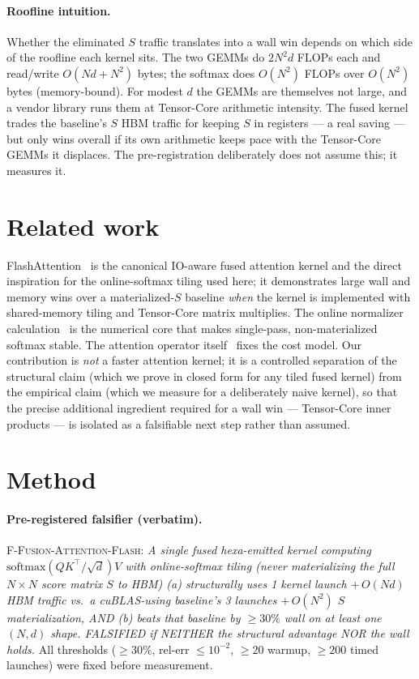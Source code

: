 \documentclass[11pt,a4paper]{article}
\newcommand{\falsifier}{\textsc{F-Fusion-Attention-Flash}}
\begin{document}
\paragraph{Roofline intuition.}
Whether the eliminated $S$ traffic translates into a wall win depends on which
side of the roofline each kernel sits. The two GEMMs do $2N^2 d$ FLOPs each and
read/write $O(Nd + N^2)$ bytes; the softmax does $O(N^2)$ FLOPs over $O(N^2)$
bytes (memory-bound). For modest $d$ the GEMMs are themselves not large, and a
vendor library runs them at Tensor-Core arithmetic intensity. The fused kernel
trades the baseline's $S$ HBM traffic for keeping $S$ in registers --- a real
saving --- but only wins overall if its own arithmetic keeps pace with the
Tensor-Core GEMMs it displaces. The pre-registration deliberately does not assume
this; it measures it.

\section{Related work}
\label{sec:related}

FlashAttention~\citep{dao2022flashattention} is the canonical IO-aware fused
attention kernel and the direct inspiration for the online-softmax tiling used
here; it demonstrates large wall and memory wins over a materialized-$S$
baseline \emph{when} the kernel is implemented with shared-memory tiling and
Tensor-Core matrix multiplies. The online normalizer
calculation~\citep{milakov2018online} is the numerical core that makes
single-pass, non-materialized softmax stable. The attention operator
itself~\citep{vaswani2017attention} fixes the cost model. Our contribution is
\emph{not} a faster attention kernel; it is a controlled separation of the
structural claim (which we prove in closed form for any tiled fused kernel) from
the empirical claim (which we measure for a deliberately naive kernel), so that
the precise additional ingredient required for a wall win --- Tensor-Core inner
products --- is isolated as a falsifiable next step rather than assumed.

\section{Method}
\label{sec:method}

\paragraph{Pre-registered falsifier (verbatim).}
\falsifier{}: \emph{A single fused hexa-emitted kernel computing
$\mathrm{softmax}(QK^\top/\sqrt{d})V$ with online-softmax tiling (never
materializing the full $N\times N$ score matrix $S$ to HBM) (a) structurally
uses 1 kernel launch $+\,O(Nd)$ HBM traffic vs.\ a cuBLAS-using baseline's 3
launches $+\,O(N^2)$ $S$ materialization, AND (b) beats that baseline by
$\geq 30\%$ wall on at least one $(N,d)$ shape. FALSIFIED if NEITHER the
structural advantage NOR the wall holds.} All thresholds ($\geq 30\%$, rel-err
$\leq 10^{-2}$, $\geq 20$ warmup, $\geq 200$ timed launches) were fixed before
measurement.
\end{document}
